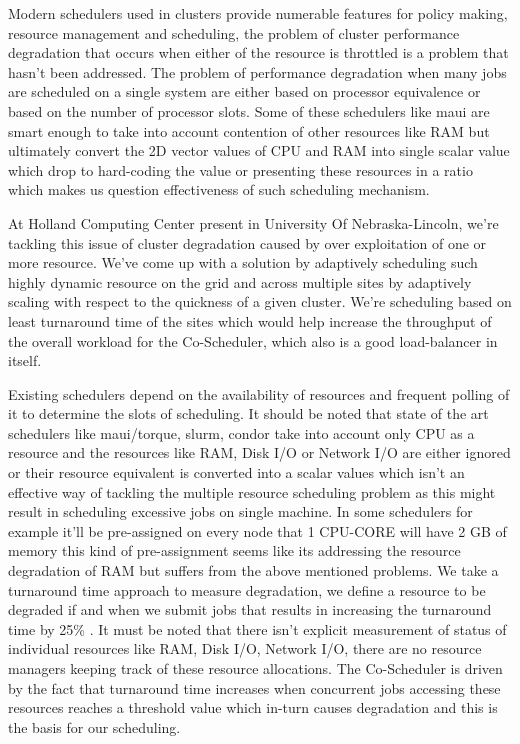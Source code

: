 \documentclass[ms,electronic,double]{nuthesis}
\begin{document}
Modern schedulers used in clusters provide numerable features for policy making, resource management 
and scheduling, the problem of cluster 
performance degradation that occurs when either of the resource is throttled is a problem that hasn't been 
addressed. The problem of performance degradation when many jobs are scheduled on a single system 
are either based on processor equivalence or based on the number of processor slots. Some of 
these schedulers like maui \cite{pbstorque} are smart enough to take into account contention of other 
resources like RAM but ultimately convert the 2D vector values of CPU and RAM 
into single scalar value which drop to hard-coding the value or presenting these resources
in a ratio which makes us question effectiveness of such scheduling mechanism. 

At Holland Computing Center present in University Of Nebraska-Lincoln, we're 
tackling this issue of cluster degradation caused by 
over exploitation of one or more resource. We've come up with a solution by adaptively scheduling 
such highly dynamic resource on the grid and across multiple sites by adaptively scaling with respect to
the quickness of a given cluster. We're scheduling based on least turnaround time of the sites which would help increase 
the throughput of the overall workload for the Co-Scheduler, which also is a good load-balancer in itself.

Existing schedulers depend on the availability of resources and frequent polling 
of it to determine the slots of scheduling. It should be noted that state of the art 
schedulers like maui/torque, slurm, condor take into account only CPU as a 
resource and the resources like RAM, Disk I/O or Network I/O are either ignored or 
their resource equivalent is converted into a scalar values which isn't an effective way of tackling the 
multiple resource scheduling problem as this might result in scheduling excessive jobs 
on single machine. In some schedulers for example it'll be pre-assigned on every node that 1 CPU-CORE will have 2 GB of
memory this kind of pre-assignment seems like its addressing the resource degradation of RAM but suffers 
from the above mentioned problems.
We take a turnaround time approach to measure degradation, we define a resource 
to be degraded if and when we submit jobs that results in increasing the 
turnaround time by 25\% . It must be 
noted that there isn't explicit measurement of status of individual resources like RAM, Disk I/O, 
Network I/O, there are no resource managers keeping track of these resource allocations. 
The Co-Scheduler is driven by the fact that turnaround time increases when 
concurrent jobs accessing these resources reaches a threshold value which in-turn causes 
degradation and this is the basis for our scheduling.
\end{document}
